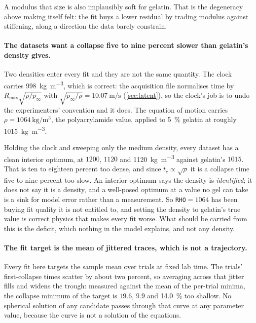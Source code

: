 \documentclass[10pt]{article}
\begin{document}
A modulus that size is also implausibly soft for gelatin. That is the degeneracy above making
itself felt: the fit buys a lower residual by trading modulus against stiffening, along a
direction the data barely constrain.

\paragraph{The datasets want a collapse five to nine percent slower than gelatin's density gives.}
Two densities enter every fit and they are not the same quantity. The clock carries
\SI{998}{\kilo\gram\per\metre\cubed}, which is correct: the acquisition file normalises time by
$R_{\max}\sqrt{\rho/p_\infty}$ with $\sqrt{p_\infty/\rho} = \SI{10.07}{\metre\per\second}$
(\cref{sec:latent}), so the clock's job is to undo the experimenters' convention and it does.
The equation of motion carries $\rho = \SI{1064}{\kilo\gram\per\metre\cubed}$, the
polyacrylamide value, applied to \SI{5}{\percent} gelatin at roughly
\SI{1015}{\kilo\gram\per\metre\cubed}.

Holding the clock and sweeping only the medium density, every dataset has a clean interior
optimum, at $1200$, $1120$ and \SI{1120}{\kilo\gram\per\metre\cubed} against gelatin's $1015$.
That is ten to eighteen percent too dense, and since $t_c \propto \sqrt{\rho}$ it is a collapse
time five to nine percent too slow. An interior optimum says the density is \emph{identified};
it does not say it is a density, and a well-posed optimum at a value no gel can take is a sink
for model error rather than a measurement. So \texttt{RHO}$=1064$ has been buying fit quality it
is not entitled to, and setting the density to gelatin's true value is correct physics that
makes every fit worse. What should be carried from this is the deficit, which nothing in the
model explains, and not any density.

\paragraph{The fit target is the mean of jittered traces, which is not a trajectory.}
Every fit here targets the sample mean over trials at fixed lab time. The trials' first-collapse
times scatter by about two percent, so averaging across that jitter fills and widens the trough:
measured against the mean of the per-trial minima, the collapse minimum of the target is
$19.6$, $9.9$ and \SI{14.0}{\percent} too shallow. No spherical solution of any candidate passes
through that curve at any parameter value, because the curve is not a solution of the equations.
\end{document}
